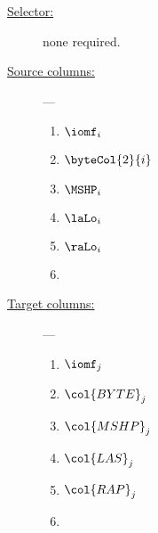 \begin{description}
	\item[\underline{Selector:}] none required.
	\item[\underline{Source columns:}] ---
	\begin{multicols}{2}
		\begin{enumerate}
			\item $\iomf_{i}$
			\item $\byteCol{2}{i}$
			\item $\MSHP_{i}$
			\item $\laLo_{i}$
			\item $\raLo_{i}$
			\item [\vspace{\fill}]
		\end{enumerate}
	\end{multicols}
	\item[\underline{Target columns:}] ---
	\begin{multicols}{2}
		\begin{enumerate}
			\item $\iomf_{j}$
			\item $\col{BYTE}_{j}$
			\item $\col{MSHP}_{j}$
			\item $\col{LAS}_{j}$
			\item $\col{RAP}_{j}$
			\item [\vspace{\fill}]
		\end{enumerate}
	\end{multicols}
\end{description}


			
